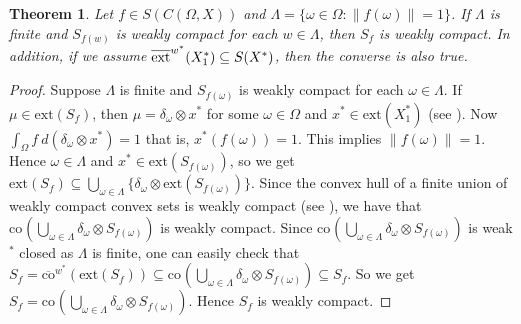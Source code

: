 \documentclass[12pt]{amsart}
\newtheorem{theorem}{Theorem}[section]
\theoremstyle{definition}
\numberwithin{equation}{section}
\begin{document}
 \begin{theorem}
 Let $f \in S(C(\Omega,X))$ and $ \Lambda = \{ \omega \in \Omega : \|f(\omega)\| = 1 \} $. If $ \Lambda $ is finite and $S_{f(w)}$ is weakly compact for each $w\in \Lambda$, then $ S_f $ is weakly compact. In addition, if we assume $\overline{\textnormal{ext}}^{w^*}{(X_{1}^*)}\subseteq S(X^*)$, then the converse is also true.
 \end{theorem}
 \begin{proof} 
Suppose $ \Lambda $ is finite and $S_{f(\omega)}$ is weakly compact for each $\omega\in \Lambda$. If $ \mu \in \text{ext}(S_f)$, then $ \mu = \delta_{\omega}\otimes x^* $ for some $ \omega \in \Omega $ and $ x^* \in \text{ext}(X_{1}^*)$ (see \cite[Theorem~1.1.$(a)$]{RS}). Now $\int_{\Omega} f \ d(\delta_{\omega}\otimes x^*) = 1$ that is, $x^* ( f(\omega)) = 1$. This implies $\|f(\omega)\| = 1$. Hence $ \omega \in \Lambda $ and $x^*\in \text{ext}(S_{f(\omega)})$, so we get $\text{ext} ( S_f) \subseteq \bigcup_{\omega\in\Lambda}\{\delta_{\omega}\otimes \text{ext}(S_{f(\omega)}) \}$. Since the convex hull of a finite union of weakly compact convex sets is weakly compact (see \cite[Theorem~3.20.$(a)$]{RW}), we have that ${\text{co}^{}}(\bigcup_{\omega\in\Lambda}^{}\delta_{\omega}\otimes S_{f(\omega)})$ is weakly compact. Since ${\text{co}^{}}(\bigcup_{\omega\in\Lambda}^{}\delta_{\omega}\otimes S_{f(\omega)})$ is weak$^*$ closed as $\Lambda$ is finite, one can easily check that $S_{f} =\overline{\text{co}}^{w^*}(\text{ext}(S_{f}))\subseteq {\text{co}^{}}(\bigcup_{\omega\in\Lambda}^{}\delta_{\omega}\otimes S_{f(\omega)})\subseteq S_{f}$. So we get $S_{f}={\text{co}^{}}(\bigcup_{\omega\in\Lambda}^{}\delta_{\omega}\otimes S_{f(\omega)})$. Hence $S_{f}$ is weakly compact. 
    

\end{proof}
\end{document}
